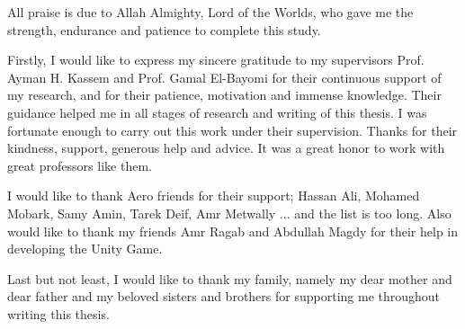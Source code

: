 All praise is due to Allah Almighty, Lord of the Worlds, who gave me the strength, endurance and patience to complete this study.

Firstly, I would like to express my sincere gratitude to my supervisors Prof. Ayman H. Kassem and Prof. Gamal El-Bayomi for their continuous support of my research, and for their patience, motivation and immense knowledge. Their guidance helped me in all stages of research and writing of this thesis. I was fortunate enough to carry out this work under their supervision. Thanks for their kindness, support, generous help and advice. It was a great honor to work with great professors like them.

I would like to thank Aero friends for their support; Hassan Ali, Mohamed Mobark, Samy Amin, Tarek Deif, Amr Metwally ... and the list is too long.
Also would like to thank my friends Amr Ragab and Abdullah Magdy for their help in developing the Unity Game.
 
Last but not least, I would like to thank my family, namely my dear mother and dear father and my beloved sisters and brothers for supporting me throughout writing this thesis.


